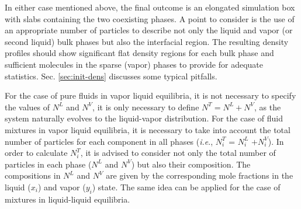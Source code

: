 \documentclass[9pt,bestpractices]{livecoms}
\begin{document}

In either case mentioned above, the final outcome is an elongated simulation
box with slabs containing the two coexisting phases. A point to consider is the
use of an appropriate number of particles to describe not only the liquid and
vapor (or second liquid) bulk phases but also the interfacial region. The
resulting density profiles should show significant flat density regions for
each bulk phase and sufficient molecules in the sparse (vapor) phases to
provide for adequate statistics. Sec. \ref{sec:init-dens} discusses some typical
pitfalls.

For the case of pure fluids in vapor \textendash{} liquid equilibria, it is not
necessary to specify the values of $N^{L}$ and $N^{V}$, it is
only necessary to define $N^{T}= N^{L}+ N^{V}$,
as the system naturally evolves to the liquid-vapor distribution. For the case
of fluid mixtures in vapor \textendash{} liquid equilibria, it is necessary to
take into account the total number of particles for each component in all
phases (\textit{i.e}., $N_{i}^{T}$ = $N_{i}^{L}$
$+ N_{i}^{V}$). In order to calculate $N_{i}^{T}$, it is
advised to consider not only the total number of particles in each phase
($N^{L}$ and $N^{V}$) but also their composition. The
compositions in $N^{L}$ and $N^{V}$ are given by the
corresponding mole fractions in the liquid ($x_{i}$) and vapor
($y_{i}$) state. The same idea can be applied for the case of mixtures
in liquid-liquid equilibria.
\end{document}
